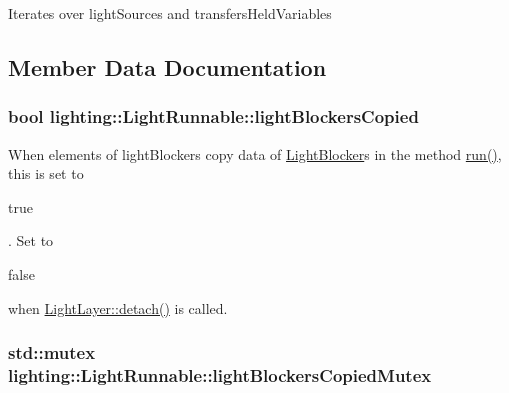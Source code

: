 Iterates over light\+Sources and transfers\+Held\+Variables 



\subsection{Member Data Documentation}
\subsubsection[{\texorpdfstring{light\+Blockers\+Copied}{lightBlockersCopied}}]{\setlength{\rightskip}{0pt plus 5cm}bool lighting\+::\+Light\+Runnable\+::light\+Blockers\+Copied}\hypertarget{classlighting_1_1LightRunnable_a46924d29904d80326c4bdeb093a2b4be}{}\label{classlighting_1_1LightRunnable_a46924d29904d80326c4bdeb093a2b4be}


When elements of light\+Blockers copy data of \hyperlink{classlighting_1_1LightBlocker}{Light\+Blocker}s in the method \hyperlink{classlighting_1_1LightRunnable_abd7dfb6a9fc5efd3730326eb85d852d0}{run()}, this is set to 
\begin{DoxyCode}
\textcolor{keyword}{true}
\end{DoxyCode}
. Set to 
\begin{DoxyCode}
\textcolor{keyword}{false}
\end{DoxyCode}
 when \hyperlink{classlighting_1_1LightLayer_ac4f833f7d7d72586f8efef6967282889}{Light\+Layer\+::detach()} is called. 

\subsubsection[{\texorpdfstring{light\+Blockers\+Copied\+Mutex}{lightBlockersCopiedMutex}}]{\setlength{\rightskip}{0pt plus 5cm}std\+::mutex lighting\+::\+Light\+Runnable\+::light\+Blockers\+Copied\+Mutex}\hypertarget{classlighting_1_1LightRunnable_a78dbcc0b308537a7b84776b9b3c79b00}{}\label{classlighting_1_1LightRunnable_a78dbcc0b308537a7b84776b9b3c79b00}


